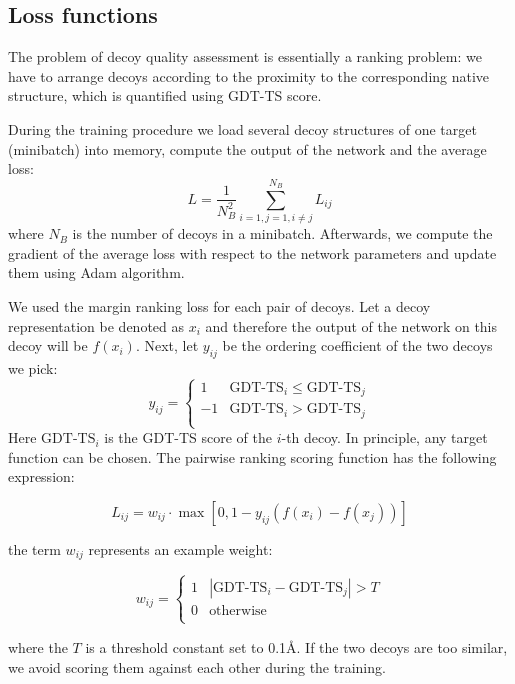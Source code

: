 \subsection{Loss functions}
The problem of decoy quality assessment is essentially a ranking problem: we have to arrange decoys according to 
the proximity to the corresponding native structure, which is quantified using GDT-TS score. 

During the training procedure we load several decoy structures of one target (minibatch) into memory, compute the 
output of the network and the average loss:
$$ L = \frac{1}{N^{2}_B} \sum_{i=1,j=1, i \neq j}^{N_B} L_{ij} $$ 
where $N_B$ is the number of decoys in a minibatch. Afterwards, we compute the gradient of the average loss with respect 
to the network parameters and update them using Adam algorithm.

We used the margin ranking loss for each pair of decoys. Let a decoy representation be denoted as $x_i$ and therefore the output
of the network on this decoy will be $f(x_i)$. Next, let $y_{ij}$ be the ordering coefficient of the two decoys we pick:
$$
y_{ij} = \begin{cases}
               1& \text{GDT-TS}_i \leq \text{GDT-TS}_j \\
               -1& \text{GDT-TS}_i > \text{GDT-TS}_j \\
            \end{cases}
$$
Here $\text{GDT-TS}_i$ is the GDT-TS score of the $i$-th decoy. In principle, any target function can be chosen. 
The pairwise ranking scoring function has the following expression:

$$ L_{ij} = w_{ij} \cdot \max \left[ 0, 1 - y_{ij} \left( f \left( x_i \right) - f \left( x_j \right) \right) \right] $$

the term $w_{ij}$ represents an example weight:

$$
w_{ij} = \begin{cases}
               1& \left| \text{GDT-TS}_i - \text{GDT-TS}_j \right| > T \\
               0& \text{otherwise} \\ 
            \end{cases}
$$

where the $T$ is a threshold constant set to 0.1{\AA}. If the two decoys are too similar, 
we avoid scoring them against each other during the training. 



